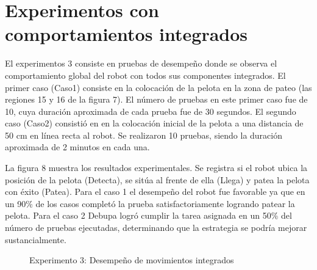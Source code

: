 \documentclass[conference, letterpaper]{IEEEtranMC1}
\begin{document}
\section{Experimentos con comportamientos integrados}
\label{sec:experimentosintegrados}

El experimentos 3 consiste en pruebas de desempeño donde se observa el comportamiento global del robot con todos sus componentes integrados. El  primer caso (Caso1) consiste en la colocación de la pelota  en la zona de pateo  (las regiones 15 y 16 de la figura 7). El número de pruebas en este primer caso fue de 10, cuya duración aproximada de cada prueba fue de 30 segundos.
El segundo caso  (Caso2) consistió en en la colocación inicial de la pelota a una distancia de 50 cm en línea recta al robot. Se realizaron 10 pruebas, siendo la duración aproximada de 2 minutos en cada una. 

La figura 8 muestra los resultados experimentales.  Se registra si el robot ubica la posición de la pelota (Detecta), se sitúa al frente de ella  (Llega) y patea la pelota con éxito (Patea). Para el caso 1 el desempeño del robot fue favorable ya que en un 90\% de los casos completó la prueba satisfactoriamente logrando patear la pelota. Para el caso 2 Debupa logró cumplir la tarea asignada en un 50\% del número de pruebas ejecutadas, determinando que la estrategia se podría mejorar sustancialmente.



\begin{figure}

\caption{Experimento 3: Desempe\~no de movimientos integrados}
\end{figure} 
\end{document}
